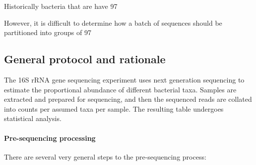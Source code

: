 Historically bacteria that are have 97%

However, it is difficult to determine how a batch of sequences should be partitioned into groups of 97%

\subsection{General protocol and rationale}
The 16S rRNA gene sequencing experiment uses next generation sequencing to estimate the proportional abundance of different bacterial taxa. Samples are extracted and prepared for sequencing, and then the sequenced reads are collated into counts per assumed taxa per sample. The resulting table undergoes statistical analysis.

\paragraph{Pre-sequencing processing}
There are several very general steps to the pre-sequencing process:

